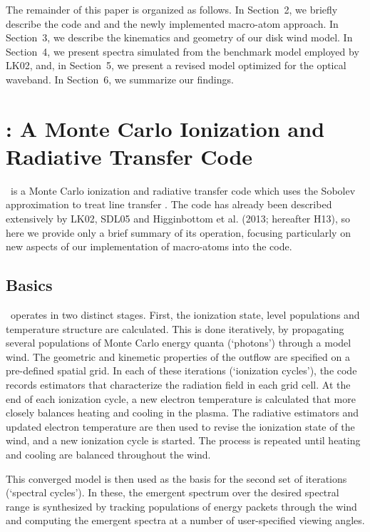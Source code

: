 \documentclass[preprint, a4paper, 11pt]{aastex}
\begin{document}
The remainder of this paper is organized as follows. In Section~2, we
briefly describe the code and and the newly implemented macro-atom
approach. In Section~3, we describe the kinematics and geometry of our
disk wind model. 
In Section~4, we present spectra simulated from the benchmark model
employed by LK02, and, in Section~5, we present a revised model
optimized for the optical waveband. In Section~6, we summarize our
findings.


%
%

\section{: A Monte Carlo Ionization and Radiative Transfer Code}

\py\ is a Monte Carlo  ionization and radiative transfer code which
uses the Sobolev approximation to treat line transfer 
\citep[e.g.][]{sobolev1957,sobolev1960,rybickihummer1978}. 
The code has already been described extensively by LK02, SDL05 and Higginbottom et al. (2013; hereafter H13), so here we provide only a brief summary of its operation, 
focusing particularly on new
aspects of our implementation of macro-atoms into the code. 

\subsection{Basics} 

\py\ operates in two distinct stages. First, the ionization state,
level populations and temperature structure are calculated. This is
done iteratively, by 
propagating several populations of Monte Carlo energy quanta (`photons')
through a model wind. The geometric and kinemetic properties of the
outflow are specified on a pre-defined spatial grid. In each of these
iterations (`ionization cycles'), the code records estimators that 
characterize the radiation field in each grid cell. At the end 
of each ionization cycle, a new electron temperature is calculated
that more closely balances heating and cooling in the 
plasma. The radiative estimators and updated electron
temperature are then used to revise the ionization state of the wind,
and a new ionization cycle is started. The process is repeated until
heating and cooling are balanced throughout the wind. 

This converged model is then used as the basis for the second set of
iterations (`spectral cycles'). In these, the emergent spectrum over
the desired spectral range is synthesized by tracking populations of
energy packets through the wind and computing the emergent spectra at
a number of user-specified viewing angles.  
\end{document}
